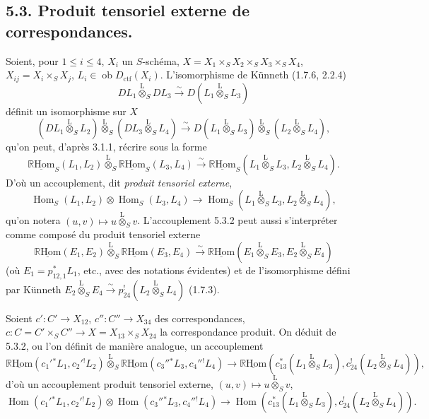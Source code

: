 \documentclass[11pt]{article}
\DeclareMathOperator{\Hom}{Hom}
\newcommand{\R}{\mathbb{R}}\newcommand{\RHomCore}{\mathbb{R}\mathrm{Hom}}
\providecommand{\RHom}{\RHomCore}
\providecommand{\uRHom}{\underline{\RHom}}
\providecommand{\RHom}{\RHomCore}
\providecommand{\Hom}{\operatorname{Hom}}
\providecommand{\RHom}{\R\mathcal{H}om}
\providecommand{\R}{\mathrm R}
\providecommand{\RHom}{\RHomCore}
\providecommand{\Hom}{\operatorname{Hom}}
\begin{document}
\subsection*{5.3. Produit tensoriel externe de correspondances.}

Soient, pour $1\leq i\leq 4$, $X_i$ un $S$-schéma, $X=X_1\times_SX_2\times_SX_3\times_SX_4$, $X_{ij}=X_i\times_SX_j$, $L_i\in\operatorname{ob}D_{\mathrm{ctf}}(X_i)$. L'isomorphisme de Künneth (1.7.6, 2.2.4)
\[
DL_1\overset{\mathrm{L}}{\otimes}_SDL_3\xrightarrow{\sim}D(L_1\overset{\mathrm{L}}{\otimes}_SL_3)
\]
définit un isomorphisme sur $X$
\begin{equation}
\tag{5.3.1}
(DL_1\overset{\mathrm{L}}{\otimes}_SL_2)\overset{\mathrm{L}}{\otimes}_S(DL_3\overset{\mathrm{L}}{\otimes}_SL_4)
\xrightarrow{\sim}D(L_1\overset{\mathrm{L}}{\otimes}_SL_3)\overset{\mathrm{L}}{\otimes}_S(L_2\overset{\mathrm{L}}{\otimes}_SL_4),
\end{equation}
qu'on peut, d'après 3.1.1, récrire sous la forme
\begin{equation}
\tag{5.3.2}
\uRHom_S(L_1,L_2)\overset{\mathrm{L}}{\otimes}_S\uRHom_S(L_3,L_4)
\xrightarrow{\sim}\uRHom_S(L_1\overset{\mathrm{L}}{\otimes}_SL_3,L_2\overset{\mathrm{L}}{\otimes}_SL_4).
\end{equation}
D'où un accouplement, dit \emph{produit tensoriel externe},
\begin{equation}
\tag{5.3.3}
\Hom_S(L_1,L_2)\otimes\Hom_S(L_3,L_4)
\longrightarrow\Hom_S(L_1\overset{\mathrm{L}}{\otimes}_SL_3,L_2\overset{\mathrm{L}}{\otimes}_SL_4),
\end{equation}
qu'on notera $(u,v)\mapsto u\overset{\mathrm{L}}{\otimes}_Sv$. L'accouplement 5.3.2 peut aussi s'interpréter comme composé du produit tensoriel externe
\[
\uRHom(E_1,E_2)\overset{\mathrm{L}}{\otimes}_S\uRHom(E_3,E_4)
\xrightarrow{\sim}\uRHom(E_1\overset{\mathrm{L}}{\otimes}_SE_3,E_2\overset{\mathrm{L}}{\otimes}_SE_4)
\]
(où $E_1=p_{12,1}^*L_1$, etc., avec des notations évidentes) et de l'isomorphisme défini par Künneth $E_2\overset{\mathrm{L}}{\otimes}_SE_4\xrightarrow{\sim}p_{24}^!(L_2\overset{\mathrm{L}}{\otimes}_SL_4)$ (1.7.3).

Soient $c':C'\to X_{12}$, $c'':C''\to X_{34}$ des correspondances, $c:C=C'\times_SC''\to X=X_{13}\times_SX_{24}$ la correspondance produit. On déduit de 5.3.2, ou l'on définit de manière analogue, un accouplement
\begin{equation}
\tag{5.3.4}
\uRHom(c_1'{}^*L_1,c_2'{}^!L_2)\overset{\mathrm{L}}{\otimes}_S\uRHom(c_3''{}^*L_3,c_4''{}^!L_4)
\longrightarrow\uRHom(c_{13}^*(L_1\overset{\mathrm{L}}{\otimes}_SL_3),c_{24}^!(L_2\overset{\mathrm{L}}{\otimes}_SL_4)),
\end{equation}
d'où un accouplement produit tensoriel externe, $(u,v)\mapsto u\overset{\mathrm{L}}{\otimes}_Sv$,
\begin{equation}
\tag{5.3.5}
\Hom(c_1'{}^*L_1,c_2'{}^!L_2)\otimes\Hom(c_3''{}^*L_3,c_4''{}^!L_4)
\longrightarrow\Hom(c_{13}^*(L_1\overset{\mathrm{L}}{\otimes}_SL_3),c_{24}^!(L_2\overset{\mathrm{L}}{\otimes}_SL_4)).
\end{equation}
\end{document}
